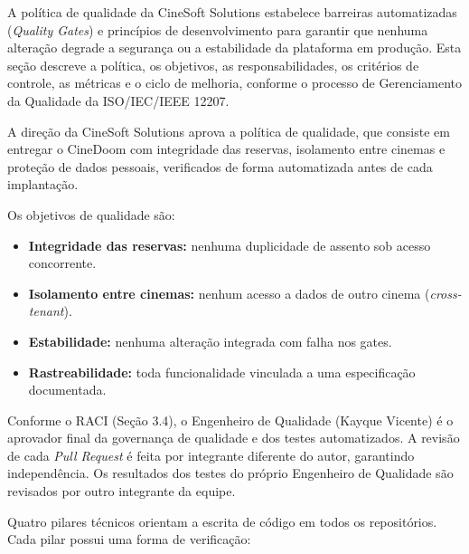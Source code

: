 
A política de qualidade da CineSoft Solutions estabelece barreiras automatizadas (\emph{Quality Gates}) e princípios de desenvolvimento para garantir que nenhuma alteração degrade a segurança ou a estabilidade da plataforma em produção. Esta seção descreve a política, os objetivos, as responsabilidades, os critérios de controle, as métricas e o ciclo de melhoria, conforme o processo de Gerenciamento da Qualidade da ISO/IEC/IEEE 12207.


A direção da CineSoft Solutions aprova a política de qualidade, que consiste em entregar o CineDoom com integridade das reservas, isolamento entre cinemas e proteção de dados pessoais, verificados de forma automatizada antes de cada implantação.

Os objetivos de qualidade são:

\begin{itemize}
\item \textbf{Integridade das reservas:} nenhuma duplicidade de assento sob acesso concorrente.
\item \textbf{Isolamento entre cinemas:} nenhum acesso a dados de outro cinema (\emph{cross-tenant}).
\item \textbf{Estabilidade:} nenhuma alteração integrada com falha nos gates.
\item \textbf{Rastreabilidade:} toda funcionalidade vinculada a uma especificação documentada.
\end{itemize}


Conforme o RACI (Seção 3.4), o Engenheiro de Qualidade (Kayque Vicente) é o aprovador final da governança de qualidade e dos testes automatizados. A revisão de cada \emph{Pull Request} é feita por integrante diferente do autor, garantindo independência. Os resultados dos testes do próprio Engenheiro de Qualidade são revisados por outro integrante da equipe.


Quatro pilares técnicos orientam a escrita de código em todos os repositórios. Cada pilar possui uma forma de verificação:

